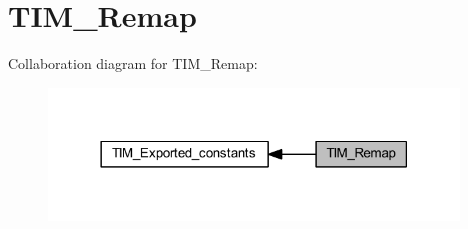 \hypertarget{group___t_i_m___remap}{}\section{T\+I\+M\+\_\+\+Remap}
\label{group___t_i_m___remap}
Collaboration diagram for T\+I\+M\+\_\+\+Remap\+:
\nopagebreak
\begin{figure}[H]
\begin{center}
\leavevmode
\includegraphics[width=309pt]{group___t_i_m___remap}
\end{center}
\end{figure}
